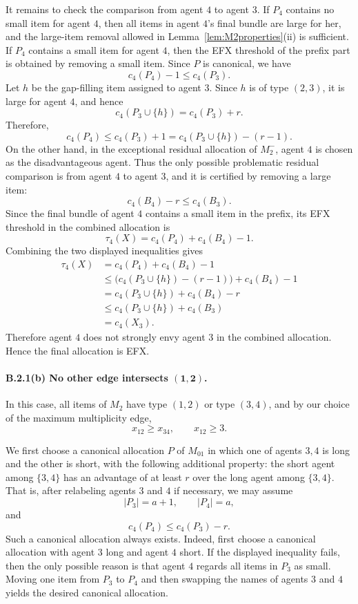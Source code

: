 \documentclass{article}
\theoremstyle{definition}
\begin{document}
It remains to check the comparison from agent $4$ to agent $3$.  If $P_4$
contains no small item for agent $4$, then all items in agent $4$'s final
bundle are large for her, and the
large-item removal allowed in Lemma~\ref{lem:M2properties}(ii) is sufficient.
If $P_4$ contains a small item for agent $4$, then the EFX threshold of the
prefix part is obtained by removing a small item.  Since $P$ is canonical,
we have
\[
    c_4(P_4)-1\le c_4(P_3).
\]
Let $h$ be the gap-filling item assigned to agent $3$.  Since $h$ is of type
$(2,3)$, it is large for agent $4$, and hence
\[
    c_4(P_3\cup\{h\})=c_4(P_3)+r.
\]
Therefore,
\[
    c_4(P_4)
    \le c_4(P_3)+1
    = c_4(P_3\cup\{h\})-(r-1).
\]
On the other hand, in the exceptional residual allocation of $M_2^-$, agent
$4$ is chosen as the disadvantageous agent.  Thus the only possible problematic
residual comparison is from agent $4$ to agent $3$, and it is certified by
removing a large item:
\[
    c_4(B_4)-r\le c_4(B_3).
\]
Since the final bundle of agent $4$ contains a small item in the prefix, its
EFX threshold in the combined allocation is
\[
    \tau_4(X)=c_4(P_4)+c_4(B_4)-1.
\]
Combining the two displayed inequalities gives
\[
\begin{aligned}
    \tau_4(X)
    &= c_4(P_4)+c_4(B_4)-1  \\
    &\le \bigl(c_4(P_3\cup\{h\})-(r-1)\bigr)+c_4(B_4)-1 \\
    &= c_4(P_3\cup\{h\})+c_4(B_4)-r \\
    &\le c_4(P_3\cup\{h\})+c_4(B_3) \\
    &= c_4(X_3).
\end{aligned}
\]
Therefore agent $4$ does not strongly envy agent $3$ in the combined
allocation.  Hence the final allocation is EFX.



\paragraph{B.2.1(b) No other edge intersects $\boldsymbol{(1,2)}$.}
In this case, all items of $M_2$ have type $(1,2)$ or type $(3,4)$, and by our
choice of the maximum multiplicity edge,
\[
    x_{12}\ge x_{34},\qquad x_{12}\ge 3.
\]

We first choose a canonical allocation $P$ of $M_{01}$ in which one of agents
$3,4$ is long and the other is short, with the following additional property:
the short agent among $\{3,4\}$ has an advantage of at least $r$ over the long
agent among $\{3,4\}$.  That is, after relabeling agents $3$ and $4$ if
necessary, we may assume
\[
    |P_3|=a+1,\qquad |P_4|=a,
\]
and
\[
    c_4(P_4)\le c_4(P_3)-r.
\]
Such a canonical allocation always exists.  Indeed, first choose a canonical
allocation with agent $3$ long and agent $4$ short.  If the displayed
inequality fails, then the only possible reason is that agent $4$ regards all
items in $P_3$ as small.  Moving one item from $P_3$ to $P_4$ and then swapping the names of
agents $3$ and $4$ yields the desired canonical allocation.
\end{document}
